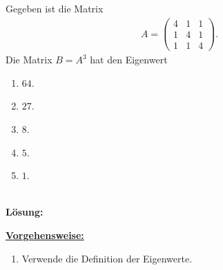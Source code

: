 \subsection*{}
Gegeben ist die Matrix
\begin{align*}
	A =
	\begin{pmatrix}
		4 & 1 & 1 \\
		1 & 4 & 1 \\
		1 & 1 & 4
	\end{pmatrix}.
\end{align*}
Die Matrix $ B = A^3 $ hat den Eigenwert
\renewcommand{\labelenumi}{(\alph{enumi})}
\begin{enumerate}
	\item
	$ 64 $.
	\item
	$ 27 $.	
	\item 
	$ 8 $.
	\item
	$ 5 $.
	\item
	$ 1 $.
\end{enumerate}
\ \\
\textbf{Lösung:}
\begin{mdframed}
\underline{\textbf{Vorgehensweise:}}
\renewcommand{\labelenumi}{\theenumi.}
\begin{enumerate}
\item Verwende die Definition der Eigenwerte.
\end{enumerate}
\end{mdframed}

